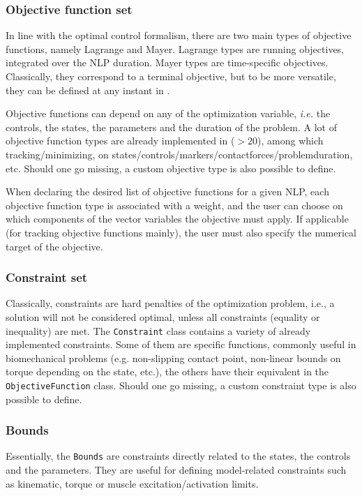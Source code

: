 \subsubsection{Objective function set}
In line with the optimal control formalism, there are two main types of objective functions, namely Lagrange and Mayer. 
Lagrange types are running objectives, integrated over the NLP duration. Mayer types are time-specific objectives. 
Classically, they correspond to a terminal objective, but to be more versatile, they can be defined at any instant in \bioptim.

Objective functions can depend on any of the optimization variable, \textit{i.e.} the controls, the states, the parameters and the duration of the problem. 
A lot of objective function types are already implemented in \bioptim ($>\!20$), among which tracking\:/\:minimizing, on states\:/\:controls\:/\:markers\:/\:contact\:forces\:/\:problem\:duration, etc. 
Should one go missing, a custom objective type is also possible to define.

When declaring the desired list of objective functions for a given NLP, each objective function type is associated with a weight, and the user can choose on which components of the vector variables the objective must apply. 
If applicable (for tracking objective functions mainly), the user must also specify the numerical target of the objective.

\subsubsection{Constraint set}
Classically, constraints are hard penalties of the optimization problem, i.e., a solution will not be considered optimal, unless all constraints (equality or inequality) are met.
The \texttt{Constraint} class contains a variety of already implemented constraints.
Some of them are specific functions, commonly useful in biomechanical problems (e.g. non-slipping contact point, non-linear bounds on torque depending on the state, etc.), the others have their equivalent in the \texttt{ObjectiveFunction} class.
Should one go missing, a custom constraint type is also possible to define.

\subsubsection{Bounds}
Essentially, the \texttt{Bounds} are constraints directly related to the states, the controls and the parameters.
They are useful for defining model-related constraints such as kinematic, torque or muscle excitation\:/\:activation limits. 

